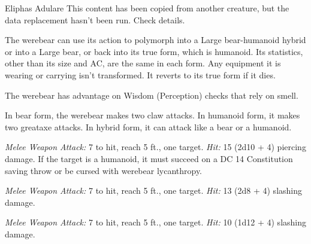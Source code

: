 \documentclass[10pt,a4paper,twoside,bg=print,twocolumn,openany,nodeprecatedcode]{dndbook}
\begin{document}
\begin{DndMonster}[float=t]{Eliphas Adulare}
\DndMonsterBasics[
armor-class = {10 in humanoid form (11 (natural armor) in bear or hybrid form)},
hit-points = {\DndDice{18d8 + 54}},
speed = {30 ft. (40 ft., climb 30 ft. in bear or hybrid form)}
]
\DndMonsterAbilityScores[
 str = 19,
 dex = 10,
 con = 17,
 int = 11,
 wis = 12,
 cha = 12
]
\DndMonsterDetails[
skills = {Perception +7},
damage-immunities = {bludgeoning, piercing, slashing from nonmagical attacks that aren't silvered},
languages = {Common (can't speak in bear form)},
challenge = 5,
]
This content has been copied from another creature, but the data replacement hasn't been run. Check details.

The werebear can use its action to polymorph into a Large bear-humanoid hybrid or into a Large bear, or back into its true form, which is humanoid. Its statistics, other than its size and AC, are the same in each form. Any equipment it is wearing or carrying isn't transformed. It reverts to its true form if it dies.

The werebear has advantage on Wisdom (Perception) checks that rely on smell.

In bear form, the werebear makes two claw attacks. In humanoid form, it makes two greataxe attacks. In hybrid form, it can attack like a bear or a humanoid.

\textsl{Melee Weapon Attack:} 7 to hit, reach 5 ft., one target. \textsl{Hit:} 15 (2d10 + 4) piercing damage. If the target is a humanoid, it must succeed on a DC 14 Constitution saving throw or be cursed with werebear lycanthropy.

\textsl{Melee Weapon Attack:} 7 to hit, reach 5 ft., one target. \textsl{Hit:} 13 (2d8 + 4) slashing damage.

\textsl{Melee Weapon Attack:} 7 to hit, reach 5 ft., one target. \textsl{Hit:} 10 (1d12 + 4) slashing damage.

\end{DndMonster}
\end{document}
